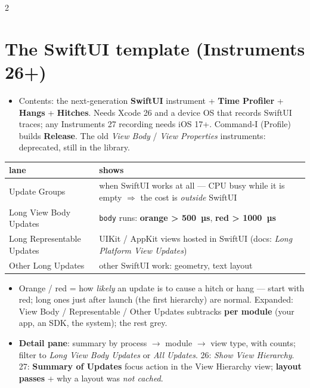 \documentclass[8pt]{extarticle}
\begin{document}
\begin{multicols}{2}
\raggedright

\section{The SwiftUI template (Instruments 26+)}
\begin{itemize}
  \item Contents: the next-generation \textbf{SwiftUI} instrument + \textbf{Time Profiler} +
        \textbf{Hangs} + \textbf{Hitches}. Needs Xcode 26 and a device OS that records SwiftUI
        traces; any Instruments 27 recording needs iOS 17+. Command-I (Profile) builds
        \textbf{Release}. The old \emph{View Body} / \emph{View Properties} instruments:
        deprecated, still in the library.
\end{itemize}
{\footnotesize
\begin{tabular}{@{}>{\raggedright\arraybackslash}p{2.15cm}>{\raggedright\arraybackslash}p{5.4cm}@{}}
\toprule
\textbf{lane} & \textbf{shows} \\
\midrule
Update Groups & when SwiftUI works at all — CPU busy while it is empty $\Rightarrow$ the cost is
\emph{outside} SwiftUI \\
Long View Body Updates & \texttt{body} runs: \textcolor{sheetOrange}{\textbf{orange > 500~µs}},
\textcolor{sheetRed}{\textbf{red > 1000~µs}} \\
Long Representable Updates & UIKit / AppKit views hosted in SwiftUI (docs: \emph{Long Platform
View Updates}) \\
Other Long Updates & other SwiftUI work: geometry, text layout \\
\bottomrule
\end{tabular}}
\begin{itemize}
  \item Orange / red = how \emph{likely} an update is to cause a hitch or hang — start with red;
        long ones just after launch (the first hierarchy) are normal. Expanded: View Body /
        Representable / Other Updates subtracks \textbf{per module} (your app, an SDK, the
        system); the rest grey.
  \item \textbf{Detail pane}: summary by process $\to$ module $\to$ view type, with counts;
        filter to \emph{Long View Body Updates} or \emph{All Updates}. 26: \emph{Show View
        Hierarchy}. 27: \textbf{Summary of Updates} focus action in the View Hierarchy view;
        \textbf{layout passes} + why a layout was \emph{not cached}.
\end{itemize}


\end{multicols}
\end{document}
